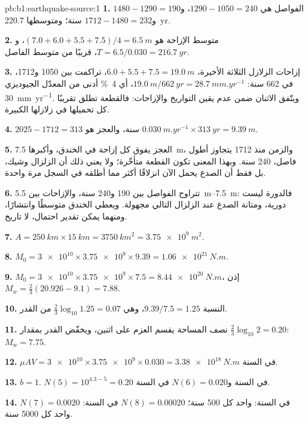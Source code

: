\begin{solution}{pb:b1:earthquake-source:1}
\textbf{1.} الفواصل هي $1290 - 1050 = 240$، و$1480 - 1290 = 190$ و$1712 - 1480 = 232$ سنة؛ ومتوسطها \qty{220.7}{yr}.

\textbf{2.} متوسط الإزاحة هو $(7.0 + 6.0 + 5.5 + 7.5)/4 = \qty{6.5}{m}$، و
$T = 6.5/0.030 = \qty{216.7}{yr}$، قريبًا من متوسط الفاصل.

\textbf{3.} إزاحات الزلازل الثلاثة الأخيرة، $6.0 + 5.5 + 7.5 =
\qty{19.0}{m}$، تراكمت بين 1050 و\num{1712}، في 662 سنة: $\qty{19.0}{m}
/\qty{662}{yr} = \qty{28.7}{mm.yr^{-1}}$، أي \qty{4}{\percent} أدنى من
المعدّل الجيوديزي \qty{30}{mm.yr^{-1}}. ويتّفق الاثنان ضمن عدم يقين التواريخ
والإزاحات: فالقطعة تطلق تقريبًا كل تحميلها في زلازلها الكبيرة.

\textbf{4.} $2025 - 1712 = 313$ سنة، والعجز هو
$\qty{0.030}{m.yr^{-1}}\times\qty{313}{yr} = \qty{9.39}{m}$.

\textbf{5.} العجز يفوق كل إزاحة في الخندق، وأكبرها \qty{7.5}{m}، والزمن منذ 1712 يتجاوز أطول فاصل، 240 سنة. وبهذا المعنى تكون القطعة متأخّرة؛ ولا يعني ذلك أن الزلزال وشيك، بل فقط أن الصدع يحمل الآن انزلاقًا أكثر مما أطلقه في السجل مرة واحدة.

\textbf{6.} تتراوح الفواصل بين 190 و\num{240} سنة، والإزاحات بين \qtyrange{5.5}{7.5}{m}: فالدورة ليست دورية، ومتانة الصدع عند الزلزال التالي مجهولة. ويعطي الخندق متوسطًا وانتشارًا، ومنهما يمكن تقدير احتمال، لا تاريخ.

\textbf{7.} $A = \qty{250}{km}\times\qty{15}{km} = \qty{3750}{km^2} =
\qty{3.75e9}{m^2}$.

\textbf{8.} $M_0 = \num{3e10}\times\num{3.75e9}\times\num{9.39} =
\qty{1.06e21}{N.m}$.

\textbf{9.} $M_0 = \num{3e10}\times\num{3.75e9}\times\num{7.5} =
\qty{8.44e20}{N.m}$، إذن $M_w = \tfrac23(20.926 - 9.1) = 7.88$.

\textbf{10.} النسبة $9.39/7.5 = 1.25$، وهي $\tfrac23\log_{10}1.25 =
0.07$ من القدر.

\textbf{11.} نصف المساحة يقسم العزم على اثنين، ويخفّض القدر بمقدار
$\tfrac23\log_{10}2 = 0.20$: $M_w = 7.75$.

\textbf{12.} $\mu A V = \num{3e10}\times\num{3.75e9}\times\num{0.030} =
\qty{3.38e18}{N.m}$ في السنة.

\textbf{13.} $b = 1$. $N(5) = 10^{4.3 - 5} = 0.20$ في السنة و$N(6) = 0.020$ في
السنة.

\textbf{14.} $N(7) = 0.0020$ في السنة: واحد كل 500 سنة؛ $N(8) = 0.00020$ في
السنة: واحد كل \num{5000} سنة.


\end{solution}
